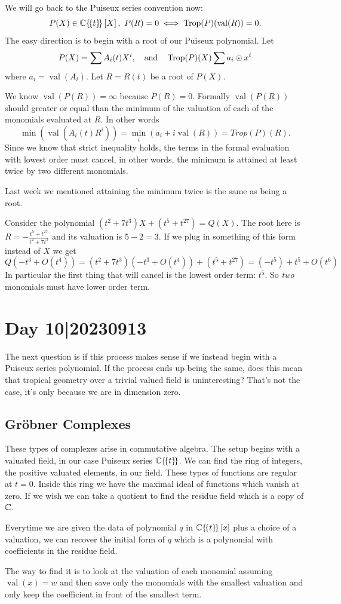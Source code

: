 \documentclass[12pt]{memoir}
\DeclareMathOperator{\val}{val}
\DeclareMathOperator{\Trop}{Trop}
\begin{document}
    We will go back to the Puiseux series convention now:
    $$P(X)\in\bC\{\!\{t\}\!\}\bonj{X},\ P(R)=0\iff \Trop(P)(\val(R))=0.$$
    The easy direction is to begin with a root of our Puiseux polynomial. Let 
    $$P(X)=\sum A_i(t)X^i,\word{and}\Trop(P)(X)\sum a_i\odot x^i$$
    where $a_i=\val(A_i)$. Let $R=R(t)$ be a root of $P(X)$.\par 
    We know $\val(P(R))=\infty$ because $P(R)=0$. Formally $\val(P(R))$ should greater or equal than the minimum of the valuation of each of the monomials evaluated at $R$. In other words 
    $$\min(\val(A_i(t)R^i))=\min_i(a_i+i\val(R))=Trop(P)(R).$$
    Since we know that strict inequality holds, the terms in the formal evaluation with lowest order must cancel, in other words, the minimum is attained at least twice by two different monomials.\par 
    Last week we mentioned attaining the minimum twice is the same as being a root.

    \begin{Ex}
        Consider the polynomial $(t^2+7t^3)X+(t^5+t^{27})=Q(X)$. The root here is $R=-\frac{t^5+t^{27}}{t^2+7t^3}$ and its valuation is $5-2=3$. If we plug in something of this form instead of $X$ we get 
        $$Q(-t^3+O(t^4))=(t^2+7t^3)(-t^3+O(t^4))+(t^5+t^{27})=(-t^5)+t^5+O(t^6)$$
        In particular the first thing that will cancel is the lowest order term: $t^5$. So \emph{two} monomials must have lower order term.
    \end{Ex}

\section{Day 10|20230913}

The next question is if this process makes sense if we instead begin with a Puiseux series polynomial. If the process ends up being the same, does this mean that tropical geometry over a trivial valued field is uninteresting? That's not the case, it's only because we are in dimension zero. 

\subsection{Gr\"obner Complexes}

These types of complexes arise in commutative algebra. The setup begins with a valuated field, in our case Puiseux series $\mathbb{C}\{\!\{t\}\!\}$. We can find the ring of integers, the positive valuated elements, in our field. These types of functions are regular at $t=0$. Inside this ring we have the maximal ideal of functions which vanish at zero. If we wish we can take a quotient to find the residue field which is a copy of $\mathbb{C}$.\par 
Everytime we are given the data of polynomial $q$ in $\mathbb{C}\{\!\{t\}\!\}\left\lbrack x\right\rbrack$ plus a choice of a valuation, we can recover the initial form of $q$ which is a polynomial with coefficients in the residue field.\par 
The way to find it is to look at the valuation of each monomial assuming $\val(x)=w$ and then save only the monomials with the smallest valuation and only keep the coefficient in front of the smallest term.
\end{document}
